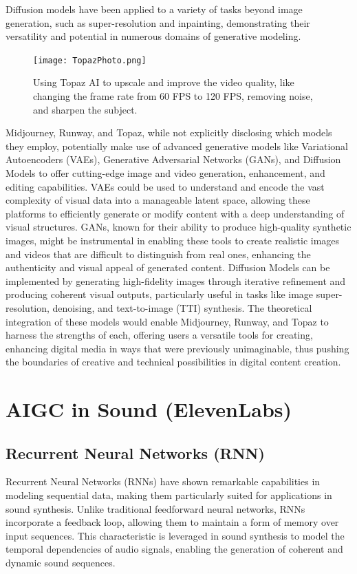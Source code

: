 \documentclass[11pt,a4paper,oneside]{report}
\begin{document}
Diffusion models have been applied to a variety of tasks beyond image generation, such as super-resolution and inpainting, demonstrating their versatility and potential in numerous domains of generative modeling.

\begin{figure}[htbp]
  \centering
  \texttt{[image: TopazPhoto.png]}
  \caption{Using Topaz AI to upscale and improve the video quality, like changing the frame rate from 60 FPS to 120 FPS, removing noise, and sharpen the subject.}
\end{figure}

Midjourney, Runway, and Topaz, while not explicitly disclosing which models they employ, potentially make use of advanced generative models like Variational Autoencoders (VAEs), Generative Adversarial Networks (GANs), and Diffusion Models to offer cutting-edge image and video generation, enhancement, and editing capabilities. 
VAEs could be used to understand and encode the vast complexity of visual data into a manageable latent space, allowing these platforms to efficiently generate or modify content with a deep understanding of visual structures. 
GANs, known for their ability to produce high-quality synthetic images, might be instrumental in enabling these tools to create realistic images and videos that are difficult to distinguish from real ones, enhancing the authenticity and visual appeal of generated content. 
Diffusion Models can be implemented by generating high-fidelity images through iterative refinement and producing coherent visual outputs, particularly useful in tasks like image super-resolution, denoising, and text-to-image (TTI) synthesis. 
The theoretical integration of these models would enable Midjourney, Runway, and Topaz to harness the strengths of each, offering users a versatile tools for creating, enhancing digital media in ways that were previously unimaginable, thus pushing the boundaries of creative and technical possibilities in digital content creation.

\section{AIGC in Sound (ElevenLabs)}

\subsection{Recurrent Neural Networks (RNN)}

Recurrent Neural Networks (RNNs) \cite{srivastava2015unsupervised, chiappa2017recurrent, ha2018world} have shown remarkable capabilities in modeling sequential data, making them particularly suited for applications in sound synthesis. 
Unlike traditional feedforward neural networks, RNNs incorporate a feedback loop, allowing them to maintain a form of memory over input sequences. 
This characteristic is leveraged in sound synthesis to model the temporal dependencies of audio signals, enabling the generation of coherent and dynamic sound sequences.
\end{document}

